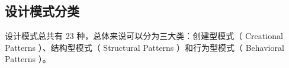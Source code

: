 \documentclass[../../../interview-questions.tex]{subfiles}
\begin{document}
\subsection{设计模式分类}

设计模式总共有 23 种，总体来说可以分为三大类：创建型模式（ Creational Patterns ）、结构型模式（ Structural Patterns ）和行为型模式（ Behavioral Patterns ）。
\end{document}
